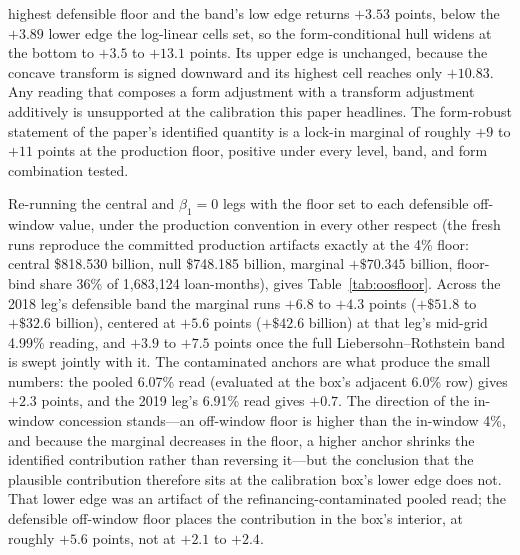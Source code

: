 \documentclass[12pt]{article}
\begin{document}
highest defensible floor and the band's low edge returns $+3.53$ points, below the $+3.89$ lower edge the log-linear cells set, so the form-conditional hull widens at the bottom to $+3.5$ to $+13.1$ points. Its upper edge is unchanged, because the concave transform is signed downward and its highest cell reaches only $+10.83$. Any reading that composes a form adjustment with a transform adjustment additively is unsupported at the calibration this paper headlines. The form-robust statement of the paper's identified quantity is a lock-in marginal of roughly $+9$ to $+11$ points at the production floor, positive under every level, band, and form combination tested.

Re-running the central and $\beta_1 = 0$ legs with the floor set to each defensible off-window value, under the production convention in every other respect (the fresh runs reproduce the committed production artifacts exactly at the 4\% floor: central \$818.530 billion, null \$748.185 billion, marginal $+\$70.345$ billion, floor-bind share 36\% of 1,683,124 loan-months), gives Table~\ref{tab:oosfloor}. Across the 2018 leg's defensible band the marginal runs $+6.8$ to $+4.3$ points ($+\$51.8$ to $+\$32.6$ billion), centered at $+5.6$ points ($+\$42.6$ billion) at that leg's mid-grid 4.99\% reading, and $+3.9$ to $+7.5$ points once the full Liebersohn--Rothstein band is swept jointly with it. The contaminated anchors are what produce the small numbers: the pooled 6.07\% read (evaluated at the box's adjacent 6.0\% row) gives $+2.3$ points, and the 2019 leg's 6.91\% read gives $+0.7$. The direction of the in-window concession stands---an off-window floor is higher than the in-window 4\%, and because the marginal decreases in the floor, a higher anchor shrinks the identified contribution rather than reversing it---but the conclusion that the plausible contribution therefore sits at the calibration box's lower edge does not. That lower edge was an artifact of the refinancing-contaminated pooled read; the defensible off-window floor places the contribution in the box's interior, at roughly $+5.6$ points, not at $+2.1$ to $+2.4$.
\end{document}

